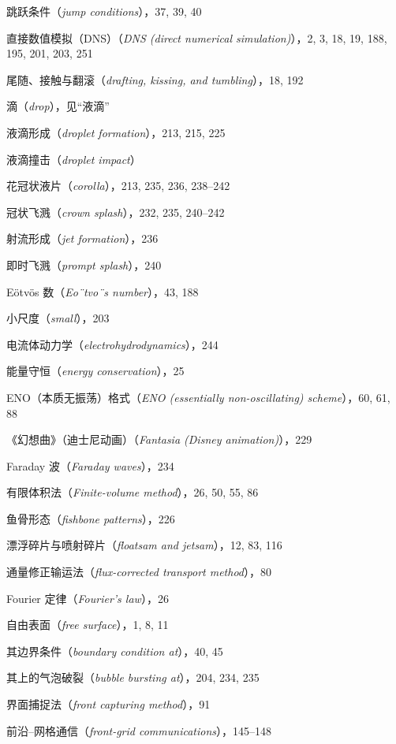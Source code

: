 \documentclass[11pt,a4paper,openany,fontset=none]{ctexbook}
\begin{document}
跳跃条件（\textit{jump conditions}），37, 39, 40\par
直接数值模拟（DNS）（\textit{DNS (direct numerical simulation)}），2, 3, 18, 19, 188, 195, 201, 203, 251\par
尾随、接触与翻滚（\textit{drafting, kissing, and tumbling}），18, 192\par
滴（\textit{drop}），见“液滴”\par
液滴形成（\textit{droplet formation}），213, 215, 225\par
液滴撞击（\textit{droplet impact}）\par
\quad 花冠状液片（\textit{corolla}），213, 235, 236, 238--242\par
\quad 冠状飞溅（\textit{crown splash}），232, 235, 240--242\par
\quad 射流形成（\textit{jet formation}），236\par
\quad 即时飞溅（\textit{prompt splash}），240\par
Eötvös 数（\textit{Eo¨tvo¨s number}），43, 188\par
\quad 小尺度（\textit{small}），203\par
电流体动力学（\textit{electrohydrodynamics}），244\par
能量守恒（\textit{energy conservation}），25\par
ENO（本质无振荡）格式（\textit{ENO (essentially non-oscillating) scheme}），60, 61, 88\par
《幻想曲》（迪士尼动画）（\textit{Fantasia (Disney animation)}），229\par
Faraday 波（\textit{Faraday waves}），234\par
有限体积法（\textit{Finite-volume method}），26, 50, 55, 86\par
鱼骨形态（\textit{fishbone patterns}），226\par
漂浮碎片与喷射碎片（\textit{floatsam and jetsam}），12, 83, 116\par
通量修正输运法（\textit{flux-corrected transport method}），80\par
Fourier 定律（\textit{Fourier’s law}），26\par
自由表面（\textit{free surface}），1, 8, 11\par
\quad 其边界条件（\textit{boundary condition at}），40, 45\par
\quad 其上的气泡破裂（\textit{bubble bursting at}），204, 234, 235\par
界面捕捉法（\textit{front capturing method}），91\par
前沿--网格通信（\textit{front-grid communications}），145--148\par
\end{document}
